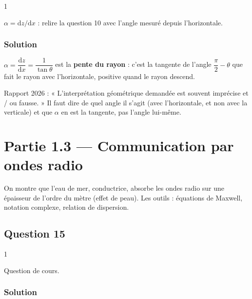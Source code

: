 \documentclass[11pt,a4paper]{article}
\begin{document}
\begin{indication}{1}

\(\alpha = \mathrm{d}z/\mathrm{d}x\) : relire la question 10 avec l'angle mesuré depuis l'horizontale.

\end{indication}

\hypertarget{solution-13}{%
\subsubsection{Solution}\label{solution-13}}

\(\alpha = \dfrac{\mathrm{d}z}{\mathrm{d}x} = \dfrac{1}{\tan\theta}\) est la \textbf{pente du rayon} : c'est la tangente de l'angle \(\dfrac{\pi}{2} - \theta\) que fait le rayon avec l'horizontale, positive quand le rayon descend.

\begin{jury}

Rapport 2026 : « L'interprétation géométrique demandée est souvent imprécise et / ou fausse. » Il faut dire de quel angle il s'agit (avec l'horizontale, et non avec la verticale) et que \(\alpha\) en est la tangente, pas l'angle lui-même.

\end{jury}

\hypertarget{partie-1.3-communication-par-ondes-radio}{%
\section{Partie 1.3 --- Communication par ondes radio}\label{partie-1.3-communication-par-ondes-radio}}

On montre que l'eau de mer, conductrice, absorbe les ondes radio sur une épaisseur de l'ordre du mètre (effet de peau). Les outils : équations de Maxwell, notation complexe, relation de dispersion.

\hypertarget{question-15}{%
\subsection{Question 15}\label{question-15}}

\begin{indication}{1}

Question de cours.

\end{indication}

\hypertarget{solution-14}{%
\subsubsection{Solution}\label{solution-14}}
\end{document}

